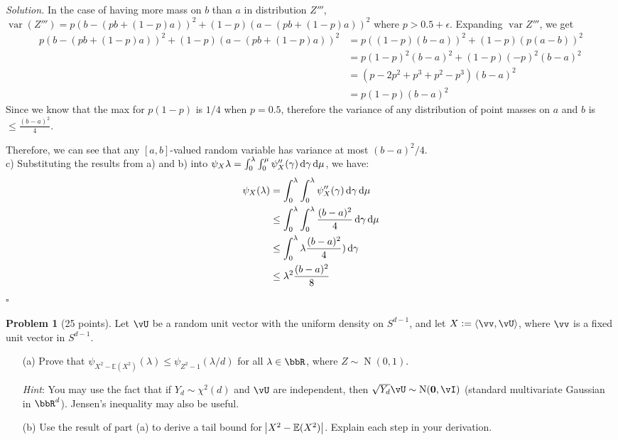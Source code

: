\documentclass[11pt]{article}
\newcommand\ip[1]{\langle #1 \rangle} %
\newcommand{\E}{\ensuremath{\mathbb{E}}} %
\newcommand{\var}{\ensuremath{\operatorname{var}}} %
\newcommand{\unitsphere}[1][d-1]{\ensuremath{S^{#1}}} %
\newcommand{\logmgf}[1]{\ensuremath{\psi_{#1}}} %
\newcommand{\Normal}{\ensuremath{\operatorname{N}}} %
\theoremstyle{definition}
\newtheorem{problem}{Problem}
\newenvironment{solution}{\noindent\emph{Solution.}}{\hfill$\square$}
\begin{document}
\begin{solution}
In the case of having more mass on $b$ than $a$ in distribution $Z'''$, $\var(Z''') = p(b - (pb + (1-p)a))^2 + (1-p)(a - (pb + (1-p)a))^2$ where $p > 0.5 + \epsilon$. Expanding $\var{Z'''}$, we get
\begin{align*}
p(b - (pb + (1-p)a))^2 + (1-p)(a - (pb + (1-p)a))^2
&= p((1-p)(b - a))^2 + (1-p)(p(a - b))^2 \\
&= p(1-p)^2(b-a)^2 + (1-p)(-p)^2(b-a)^2 \\
&= (p - 2p^2 + p^3 + p^2 - p^3)(b-a)^2 \\
&= p(1-p)(b-a)^2
\end{align*}
Since we know that the max for $p(1-p)$ is $1/4$ when $p = 0.5$, therefore the variance of any distribution of point masses on $a$ and $b$ is $\leq \frac{(b - a)^2 }{4}$.
 
Therefore, we can see that any $[a,b]$-valued random variable has variance at most $(b-a)^2/4$.
\newline
\\ c) Substituting the results from a) and b) into $\logmgf{X}{\lambda} = \int_0^\lambda \int_0^\mu \logmgf{X}''(\gamma) \dif\gamma \dif\mu$, we have:
\begin{align*}
\logmgf{X}(\lambda)
&= \int_0^\lambda \int_0^{\lambda} \logmgf{X}''(\gamma) \dif\gamma \dif\mu \\
&\leq \int_0^\lambda \int_0^{\lambda} \frac{(b-a)^2}{4} \dif\gamma \dif\mu \\
&\leq \int_0^\lambda \lambda \frac{(b-a)^2}{4}) \dif\gamma \\
&\leq \lambda^2 \frac{(b-a)^2}{8}
\end{align*}
\end{solution}

\newpage


\begin{problem}[25 points]
  Let $\vU$ be a random unit vector with the uniform density on $\unitsphere$, and let $X := \ip{\vv,\vU}$, where $\vv$ is a fixed unit vector in
  $\unitsphere$.
  \begin{enumerate}
    \item[(a)]
      Prove that $\logmgf{X^2-\E(X^2)}(\lambda) \leq \logmgf{Z^2-1}(\lambda/d)$
      for all $\lambda \in \bbR$, where $Z \sim \Normal(0,1)$.

      \emph{Hint}: You may use the fact that if $Y_d \sim \chi^2(d)$ and $\vU$ are independent, then $\sqrt{Y_d}\vU \sim \Normal(\boldsymbol0,\vI)$ (standard multivariate Gaussian in $\bbR^d$).
      Jensen's inequality may also be useful.

    \item[(b)]
      Use the result of part (a) to derive a tail bound for $\abs{X^2-\E(X^2)}$.
      Explain each step in your derivation.

  \end{enumerate}
\end{problem}
\end{document}
